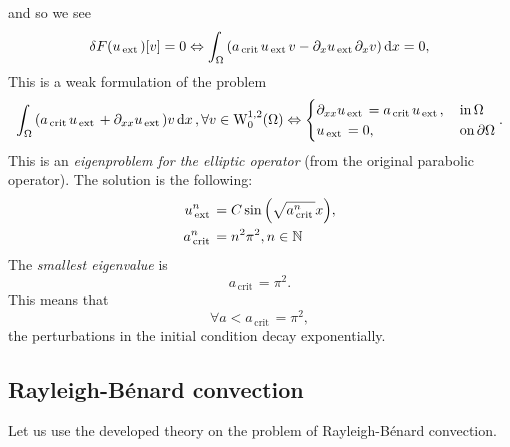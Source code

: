\documentclass[../main.tex]{subfiles}
\begin{document}
and so we see
\[
	\delta F\qty(u_{\, \text{ext} \,})[v] = 0 \Leftrightarrow \int_{\Omega}\qty(a_{\, \text{crit} \,} u_{\, \text{ext} \,} v - \partial_x u_{\, \text{ext} \,} \partial_x v)\dd{x} = 0, 
\]
This is a weak formulation of the problem
\[
	\int_{\Omega}\qty(a_{\, \text{crit} \,} u_{\, \text{ext} \,}+ \partial_{xx}u_{\, \text{ext} \,})v\dd{x}, \forall v \in \WkpzeroSet[1][2]{\Omega} \Leftrightarrow \begin{cases}\partial_{xx}u_{\, \text{ext} \,} =  a_{\, \text{crit} \,}u_{\, \text{ext} \,}, & \, \text{in} \,\Omega \\
		u_{\, \text{ext} \,} = 0,& \, \text{on} \, \partial \Omega 
	\end{cases}.
	\]
	This is an \textit{eigenproblem for the elliptic operator} (from the original parabolic operator). The solution is the following:
	\begin{align*}
		u_{\, \text{ext} \,}^n &= C \sin\qty(\sqrt{a_{\, \text{crit} \,}^n}x), \\
		a^n_{\, \text{crit} \,} &= n^{2}\pi^{2}, n \in {\mathbb N}
	\end{align*}
The \textit{smallest eigenvalue} is
\[
	a_{\, \text{crit} \,} = \pi^{2}.
\]
This means that
\[
	\forall a < a_{\, \text{crit} \,} = \pi^{2},
\]
the perturbations in the initial condition decay exponentially.

\subsection{Rayleigh-Bénard convection}
\label{sec:convection}
Let us use the developed theory on the problem of Rayleigh-Bénard convection. 

\begin{center}
\end{center}
\end{document}
